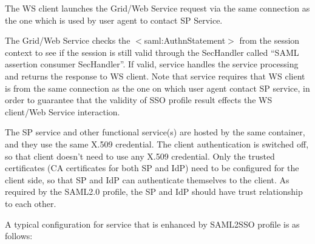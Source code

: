 \documentclass{article}                            %
\begin{document}
\begin{list}{.}
    \item The WS client launches the Grid/Web Service request via the same connection as the one which is used by user agent to contact SP Service.

    \item The Grid/Web Service checks the $<$saml:AuthnStatement$>$ from the session context to see if the session is still valid through the SecHandler called ``SAML assertion consumer SecHandler''. If valid, service handles the service processing and returns the response to WS client. Note that service requires that WS client is from the same connection as the one on which user agent contact SP service, in order to guarantee that the validity of SSO profile result effects the WS client/Web Service interaction.

    The SP service and other functional service(s) are hosted by the same container, and they use the same X.509 credential. The client authentication is switched off, so that client doesn’t need to use any X.509 credential. Only the trusted certificates (CA certificates for both SP and IdP) need to be configured for the client side, so that SP and IdP can authenticate themselves to the client. As required by the SAML2.0 profile, the SP and IdP should have trust relationship to each other.
   \end{list}

    A typical configuration for service that is enhanced by SAML2SSO profile is as follows:
\end{document}
